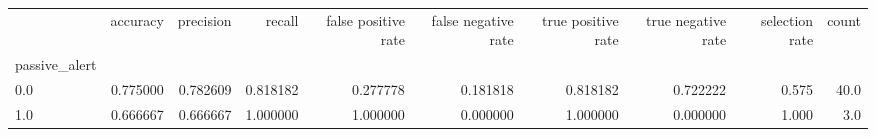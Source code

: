 \begin{tabular}{lrrrrrrrrr}
\toprule
{} &  accuracy &  precision &    recall &  false positive rate &  false negative rate &  true positive rate &  true negative rate &  selection rate &  count \\
passive\_alert &           &            &           &                      &                      &                     &                     &                 &        \\
\midrule
0.0           &  0.775000 &   0.782609 &  0.818182 &             0.277778 &             0.181818 &            0.818182 &            0.722222 &           0.575 &   40.0 \\
1.0           &  0.666667 &   0.666667 &  1.000000 &             1.000000 &             0.000000 &            1.000000 &            0.000000 &           1.000 &    3.0 \\
\bottomrule
\end{tabular}
